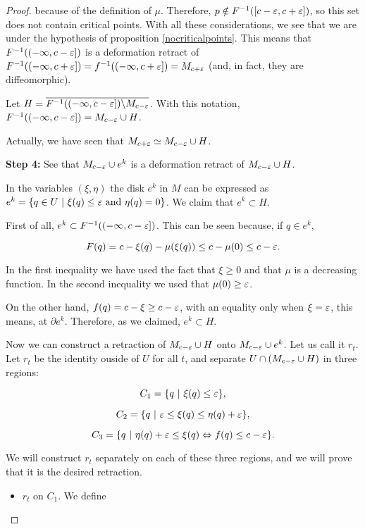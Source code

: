 \begin{proof}
because of the definition of $\mu$. Therefore, $p \notin F^{-1}([c-\varepsilon,c+\varepsilon])$, so this set does not contain critical points. With all these considerations, we see that we are under the hypothesis of proposition \ref{nocriticalpoints}. This means that $F^{-1}((-\infty,c-\varepsilon])$ is a deformation retract of $F^{-1}((-\infty,c+\varepsilon]) = f^{-1}((-\infty,c+\varepsilon]) = M_{c+\varepsilon}$ (and, in fact, they are diffeomorphic).

Let $H = \overline{F^{-1}((-\infty,c-\varepsilon]) \backslash M_{c-\varepsilon}}$. With this notation, $F^{-1}((-\infty,c-\varepsilon]) = M_{c-\varepsilon} \cup H$.

Actually, we have seen that $M_{c+\varepsilon} \simeq M_{c-\varepsilon} \cup H$.

{\bf Step 4:} See that $M_{c-\varepsilon} \cup e^k$ is a deformation retract of $M_{c-\varepsilon} \cup H$.

In the variables $(\xi, \eta)$ the disk $e^k$ in $M$ can be expressed as $e^k = \{q \in U \ | \ \xi(q) \leq \e \text{ and } \eta(q) = 0\}$. We claim that $e^k \subset H$.

First of all, $e^k \subset F^{-1}((-\infty,c-\varepsilon])$. This can be seen because, if $q \in e^k$,

$$F(q) = c -\xi(q) - \mu(\xi(q)) \leq c - \mu(0) \leq c - \varepsilon .$$

In the first inequality we have used the fact that $\xi \geq 0$ and that $\mu$ is a decreasing function. In the second inequality we used that $\mu(0) \geq \varepsilon$.

On the other hand, $f(q) = c - \xi \geq c - \varepsilon$, with an equality only when $\xi = \varepsilon$, this means, at $\partial e^k$. Therefore, as we claimed, $e^k \subset H$.

Now we can construct a retraction of $M_{c-\varepsilon} \cup H$ onto $M_{c-\varepsilon} \cup e^k$. Let us call it $r_t$. Let $r_t$ be the identity ouside of $U$ for all $t$, and separate $U \cap \left( M_{c-\varepsilon} \cup H \right)$ in three regions:

$$C_1 = \{ q \ | \ \xi(q) \leq \varepsilon \} ,$$

$$C_2 = \{ q \ | \ \varepsilon \leq \xi(q) \leq \eta(q) + \varepsilon \} ,$$

$$C_3 = \{ q \ | \ \eta(q) + \varepsilon \leq \xi(q) \Leftrightarrow f(q) \leq c - \varepsilon \} .$$

We will construct $r_t$ separately on each of these three regions, and we will prove that it is the desired retraction.

\begin{itemize}
	\item $r_t$ on $C_1$. We define


\end{itemize}
\end{proof}
